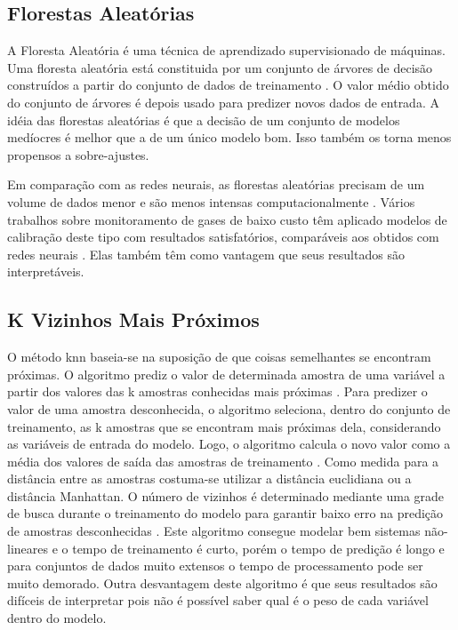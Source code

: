 \subsection{Florestas Aleatórias}

A Floresta Aleatória é uma técnica de aprendizado supervisionado de máquinas. Uma floresta aleatória está constituida por um conjunto de árvores de decisão construídos a partir do conjunto de dados de treinamento \cite{geron2019maos}. O valor médio obtido do conjunto de árvores é depois usado para predizer novos dados de entrada. A idéia das florestas aleatórias é que a decisão de um conjunto de modelos medíocres é melhor que a de um único modelo bom. Isso também os torna menos propensos a sobre-ajustes.

Em comparação com as redes neurais, as florestas aleatórias precisam de um volume de dados menor e são menos intensas computacionalmente \cite{Montantes20203Science}. Vários trabalhos sobre monitoramento de gases de baixo custo têm aplicado modelos de calibração deste tipo com resultados satisfatórios, comparáveis aos obtidos com redes neurais \cite{Karagulian2019ReviewMonitoring}. Elas também têm como vantagem que seus resultados são interpretáveis.

\subsection{K Vizinhos Mais Próximos}

O método \gls{knn} baseia-se na suposição de que coisas semelhantes se encontram próximas. O algoritmo prediz o valor de determinada amostra de uma variável a partir dos valores das k amostras conhecidas mais próximas \cite{Altman1992AnRegression}. Para predizer o valor de uma amostra desconhecida, o algoritmo seleciona, dentro do conjunto de treinamento, as k amostras que se encontram mais próximas dela, considerando as variáveis de entrada do modelo. Logo, o algoritmo calcula o novo valor como a média dos valores de saída das amostras de treinamento \cite{Kramer2013K-NearestNeighbors}. Como medida para a distância entre as amostras costuma-se utilizar a distância euclidiana ou a distância Manhattan. O número de vizinhos é determinado mediante uma grade de busca durante o treinamento do modelo para garantir baixo erro na predição de amostras desconhecidas \cite{Miller2019TheScience}. Este algoritmo consegue modelar bem sistemas não-lineares e o tempo de treinamento é curto, porém o tempo de predição é longo e para conjuntos de dados muito extensos o tempo de processamento pode ser muito demorado. Outra desvantagem deste algoritmo é que seus resultados são difíceis de interpretar pois não é possível saber qual é o peso de cada variável dentro do modelo.